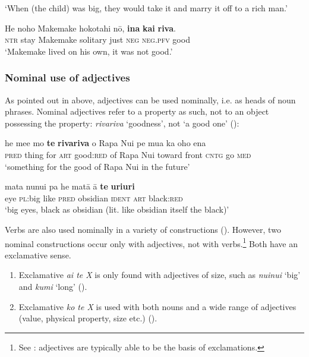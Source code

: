 \glt 
‘When (the child) was big, they would take it and marry it off to a rich man.’ \textstyleExampleref{[R399.004]} 
\z

\ea\label{ex:3.106}
\gll He noho Makemake hokotahi nō, \textbf{{\ꞌ}ina} \textbf{kai} \textbf{riva}.\\
\textsc{ntr} stay Makemake solitary just \textsc{neg} \textsc{neg.pfv} good\\

\glt 
‘Makemake lived on his own, it was not good.’ \textstyleExampleref{[Ley-1-01.001]}
\z

\subsubsection[Nominal use of adjectives]{Nominal use of adjectives}\label{sec:3.5.1.6}

As pointed out in  above, adjectives can be used nominally, i.e. as heads of noun phrases. Nominal adjectives refer to a property as such, not to an object possessing the property: \textit{rivariva} ‘goodness’, not ‘a good one’ ():

\ea\label{ex:3.107}
\gll he me{\ꞌ}e mo \textbf{te} \textbf{rivariva} o Rapa Nui pe mu{\ꞌ}a ka oho ena\\
\textsc{pred} thing for \textsc{art} good:\textsc{red} of Rapa Nui toward front \textsc{cntg} go \textsc{med}\\

\glt 
‘something for the good of Rapa Nui in the future’ \textstyleExampleref{[R470.011]} 
\z

\ea\label{ex:3.108}
\gll mata nunui pa he matā {\ꞌ}ā \textbf{te} \textbf{{\ꞌ}uri{\ꞌ}uri}\\
eye \textsc{pl}:big like \textsc{pred} obsidian \textsc{ident} \textsc{art} black:\textsc{red}\\

\glt
‘big eyes, black as obsidian (lit. like obsidian itself the black)’ \textstyleExampleref{[R310.021]} 
\z

Verbs are also used nominally in a variety of constructions (). However, two nominal constructions occur only with adjectives, not with verbs.\footnote{\label{fn:136}See \citet[29]{Bhat1994}: adjectives are typically able to be the basis of exclamations.} Both have an exclamative sense.

\begin{enumerate}
\item 
Exclamative \textit{{\ꞌ}ai te X} is only found with adjectives of size, such as \textit{nuinui} ‘big’ and \textit{kumi} ‘long’ ().

\item 
Exclamative \textit{ko te X} is used with both nouns and a wide range of adjectives (value, physical property, size etc.) ().

\end{enumerate}


